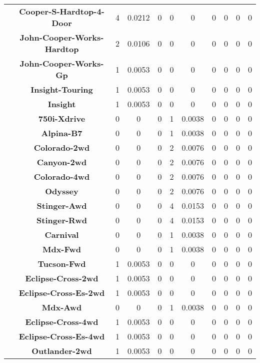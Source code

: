 \begin{center}
\begin{tabular}{|c|c||@{\hspace{1ex}}||c|c|c||@{\hspace{1ex}}||c|c|c||@{\hspace{1ex}}||c|c|c||@{\hspace{1ex}}||}
\cline{2-11}
  & {\bf Cooper-S-Hardtop-4-Door} & 4 & 0.0212 & 0 & 0 & 0 & 0 & 0 & 0 & 0 \\
\cline{2-11}
  & {\bf John-Cooper-Works-Hardtop} & 2 & 0.0106 & 0 & 0 & 0 & 0 & 0 & 0 & 0 \\
\cline{2-11}
  & {\bf John-Cooper-Works-Gp} & 1 & 0.0053 & 0 & 0 & 0 & 0 & 0 & 0 & 0 \\
\cline{2-11}
  & {\bf Insight-Touring} & 1 & 0.0053 & 0 & 0 & 0 & 0 & 0 & 0 & 0 \\
\cline{2-11}
  & {\bf Insight} & 1 & 0.0053 & 0 & 0 & 0 & 0 & 0 & 0 & 0 \\
\cline{2-11}
  & {\bf 750i-Xdrive} & 0 & 0 & 0 & 1 & 0.0038 & 0 & 0 & 0 & 0 \\
\cline{2-11}
  & {\bf Alpina-B7} & 0 & 0 & 0 & 1 & 0.0038 & 0 & 0 & 0 & 0 \\
\cline{2-11}
  & {\bf Colorado-2wd} & 0 & 0 & 0 & 2 & 0.0076 & 0 & 0 & 0 & 0 \\
\cline{2-11}
  & {\bf Canyon-2wd} & 0 & 0 & 0 & 2 & 0.0076 & 0 & 0 & 0 & 0 \\
\cline{2-11}
  & {\bf Colorado-4wd} & 0 & 0 & 0 & 2 & 0.0076 & 0 & 0 & 0 & 0 \\
\cline{2-11}
  & {\bf Odyssey} & 0 & 0 & 0 & 2 & 0.0076 & 0 & 0 & 0 & 0 \\
\cline{2-11}
  & {\bf Stinger-Awd} & 0 & 0 & 0 & 4 & 0.0153 & 0 & 0 & 0 & 0 \\
\cline{2-11}
  & {\bf Stinger-Rwd} & 0 & 0 & 0 & 4 & 0.0153 & 0 & 0 & 0 & 0 \\
\cline{2-11}
  & {\bf Carnival} & 0 & 0 & 0 & 1 & 0.0038 & 0 & 0 & 0 & 0 \\
\cline{2-11}
  & {\bf Mdx-Fwd} & 0 & 0 & 0 & 1 & 0.0038 & 0 & 0 & 0 & 0 \\
\cline{2-11}
  & {\bf Tucson-Fwd} & 1 & 0.0053 & 0 & 0 & 0 & 0 & 0 & 0 & 0 \\
\cline{2-11}
  & {\bf Eclipse-Cross-2wd} & 1 & 0.0053 & 0 & 0 & 0 & 0 & 0 & 0 & 0 \\
\cline{2-11}
  & {\bf Eclipse-Cross-Es-2wd} & 1 & 0.0053 & 0 & 0 & 0 & 0 & 0 & 0 & 0 \\
\cline{2-11}
  & {\bf Mdx-Awd} & 0 & 0 & 0 & 1 & 0.0038 & 0 & 0 & 0 & 0 \\
\cline{2-11}
  & {\bf Eclipse-Cross-4wd} & 1 & 0.0053 & 0 & 0 & 0 & 0 & 0 & 0 & 0 \\
\cline{2-11}
  & {\bf Eclipse-Cross-Es-4wd} & 1 & 0.0053 & 0 & 0 & 0 & 0 & 0 & 0 & 0 \\
\cline{2-11}
  & {\bf Outlander-2wd} & 1 & 0.0053 & 0 & 0 & 0 & 0 & 0 & 0 & 0 \\

\end{tabular}
\end{center}
